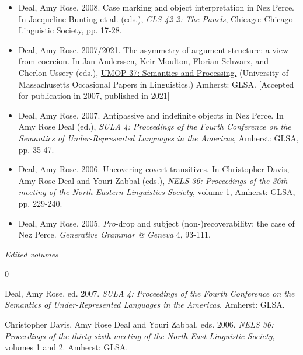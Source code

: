 \documentclass[12pt]{article}
\begin{document}
\begin{itemize}[labelsep=.5cm,leftmargin=0cm,itemindent=0cm]
  \item Deal, Amy Rose. 2008. Case marking and object interpretation in Nez Perce. In Jacqueline Bunting et al. (eds.), \textit{CLS 42-2: The Panels}, Chicago: Chicago Linguistic Society, pp. 17-28.

\item Deal, Amy Rose. 2007/2021. The asymmetry of argument structure: a view from coercion. In Jan Anderssen, Keir Moulton, Florian Schwarz, and Cherlon Ussery (eds.), \href{https://scholarworks.umass.edu/ umop/vol33/iss1/}{UMOP 37: Semantics and Processing.} (University of Massachusetts Occasional Papers in Linguistics.) Amherst: GLSA.  [Accepted for publication in 2007, published in 2021]


   \item Deal, Amy Rose. 2007. Antipassive and indefinite objects in Nez Perce. In Amy Rose Deal (ed.), \textit{SULA 4: Proceedings of the Fourth Conference on the Semantics of Under-Represented Languages in the Americas}, Amherst: GLSA, pp. 35-47. 

   \item[] Deal, Amy Rose. 2006. Uncovering covert transitives. In Christopher Davis, Amy Rose Deal and Youri Zabbal (eds.), \textit{NELS 36: Proceedings of the 36th meeting of the North Eastern Linguistics Society}, volume 1, Amherst: GLSA, pp. 229-240. 

   \item[] Deal, Amy Rose. 2005. \textit{Pro}-drop and subject (non-)recoverability: the case of Nez Perce. \emph{Generative Grammar @ Geneva} 4, 93-111.

\end{itemize}

\bigskip

\noindent\emph{Edited volumes\vspace{0.05in}}


\begin{benumerate}{0}
\item[]
 Deal, Amy Rose, ed. 2007. \emph{SULA 4: Proceedings of the Fourth Conference on the Semantics of Under-Represented Languages in the Americas}. Amherst: GLSA. 

\item[]
 Christopher Davis, Amy Rose Deal and Youri Zabbal, eds. 2006. \emph{NELS 36: Proceedings of the thirty-sixth meeting of the North East Linguistic Society}, volumes 1 and 2. Amherst: GLSA. 
\end{benumerate}
\end{document}
